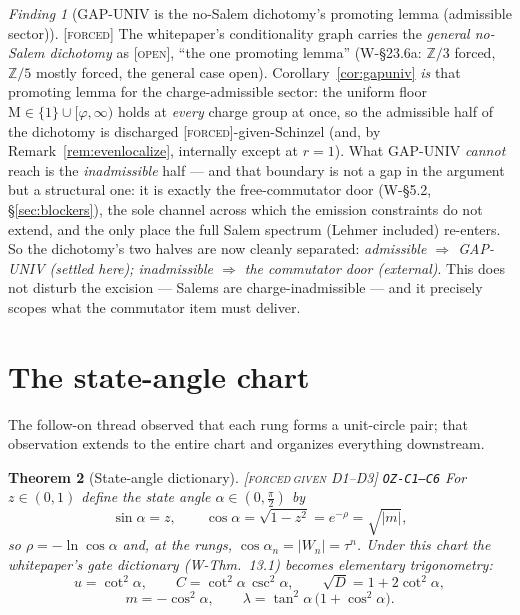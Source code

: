 \documentclass[11pt]{article}
\newcommand{\tagF}{\textcolor{cF}{\textsc{[forced]}}}
\newcommand{\tagFD}{\textcolor{cF}{\textsc{[forced}}\,\textcolor{cD}{\textsc{given D1--D3]}}}
\newcommand{\tagO}{\textcolor{cO}{\textsc{[open]}}}
\newcommand{\hx}[1]{\textcolor{cC}{\footnotesize\texttt{#1}}}
\newcommand{\Z}{\mathbb{Z}}
\newcommand{\gp}{\varphi}
\newcommand{\M}{\mathrm{M}}
\theoremstyle{plain}
\newtheorem{theorem}{Theorem}[section]
\theoremstyle{definition}
\theoremstyle{remark}
\newtheorem{finding}[theorem]{Finding}
\begin{document}
\begin{finding}[GAP-UNIV is the no-Salem dichotomy's promoting lemma (admissible sector)]\label{find:gapdichotomy}\tagF{}
The whitepaper's conditionality graph carries the \emph{general no-Salem
dichotomy} as \tagO{}, ``the one promoting lemma'' (W-\S23.6a: $\Z/3$ forced,
$\Z/5$ mostly forced, the general case open). Corollary~\ref{cor:gapuniv} \emph{is}
that promoting lemma for the charge-admissible sector: the uniform floor
$\M\in\{1\}\cup[\gp,\infty)$ holds at \emph{every} charge group at once, so the
admissible half of the dichotomy is discharged \tagF{}-given-Schinzel (and, by
Remark~\ref{rem:evenlocalize}, internally except at $r=1$). What GAP-UNIV
\emph{cannot} reach is the \emph{inadmissible} half --- and that boundary is not a
gap in the argument but a structural one: it is exactly the free-commutator door
(W-\S5.2, \S\ref{sec:blockers}), the sole channel across which the emission
constraints do not extend, and the only place the full Salem spectrum (Lehmer
included) re-enters. So the dichotomy's two halves are now cleanly separated:
\emph{admissible $\Rightarrow$ GAP-UNIV (settled here); inadmissible $\Rightarrow$
the commutator door (external)}. This does not disturb the excision --- Salems
are charge-inadmissible --- and it precisely scopes what the commutator item must
deliver.
\end{finding}

\section{The state-angle chart}\label{sec:stateangle}

The follow-on thread observed that each rung forms a unit-circle pair; that
observation extends to the entire chart and organizes everything downstream.

\begin{theorem}[State-angle dictionary]\label{thm:stateangle}\tagFD{} \hx{OZ-C1--C6}
For $z\in(0,1)$ define the \emph{state angle} $\alpha\in(0,\tfrac\pi2)$ by
\[
\sin\alpha=z,\qquad \cos\alpha=\sqrt{1-z^2}=e^{-\rho}=\sqrt{|m|},
\]
so $\rho=-\ln\cos\alpha$ and, at the rungs, $\cos\alpha_n=|W_n|=\tau^n$.
Under this chart the whitepaper's gate dictionary (W-Thm.\ 13.1) becomes
elementary trigonometry:
\[
u=\cot^2\alpha,\qquad
C=\cot^2\alpha\,\csc^2\alpha,\qquad
\sqrt D=1+2\cot^2\alpha,
\]
\[
m=-\cos^2\alpha,\qquad
\lambda=\tan^2\alpha\,\bigl(1+\cos^2\alpha\bigr).
\]
\end{theorem}
\end{document}
